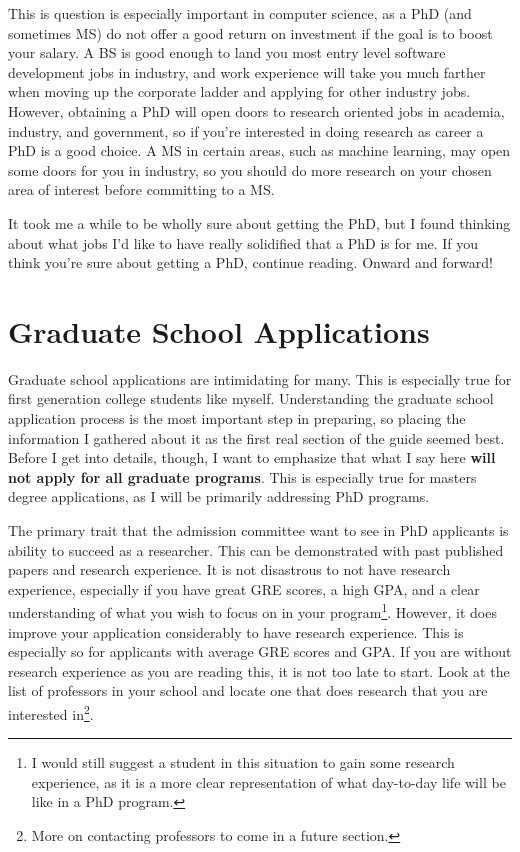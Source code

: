 \documentclass[12pt]{article}
\begin{document}
This is question is especially important in computer science, as a PhD (and sometimes MS) do not offer a good return on investment if the goal is to boost your salary. A BS is good enough to land you most entry level software development jobs in industry, and work experience will take you much farther when moving up the corporate ladder and applying for other industry jobs. However, obtaining a PhD will open doors to research oriented jobs in academia, industry, and government, so if you're interested in doing research as career a PhD is a good choice. \cite{robertsonwebsite} A MS in certain areas, such as machine learning, may open some doors for you in industry, so you should do more research on your chosen area of interest before committing to a MS.

It took me a while to be wholly sure about getting the PhD, but I found thinking about what jobs I'd like to have really solidified that a PhD is for me. If you think you're sure about getting a PhD, continue reading. Onward and forward!

\section{Graduate School Applications}

Graduate school applications are intimidating for many. This is especially true for first generation college students like myself. Understanding the graduate school application process is the most important step in preparing, so placing the information I gathered about it as the first real section of the guide seemed best. Before I get into details, though, I want to emphasize that what I say here \textbf{will not apply for all graduate programs}. This is especially true for masters degree applications, as I will be primarily addressing PhD programs.

The primary trait that the admission committee want to see in PhD applicants is ability to succeed as a researcher. This can be demonstrated with past published papers and research experience. It is not disastrous to not have research experience, especially if you have great GRE scores, a high GPA, and a clear understanding of what you wish to focus on in your program\footnote{I would still suggest a student in this situation to gain some research experience, as it is a more clear representation of what day-to-day life will be like in a PhD program.}. However, it does improve your application considerably to have research experience. This is especially so for applicants with average GRE scores and GPA. If you are without research experience as you are reading this, it is not too late to start. Look at the list of professors in your school and locate one that does research that you are interested in\footnote{More on contacting professors to come in a future section.}.
\end{document}
